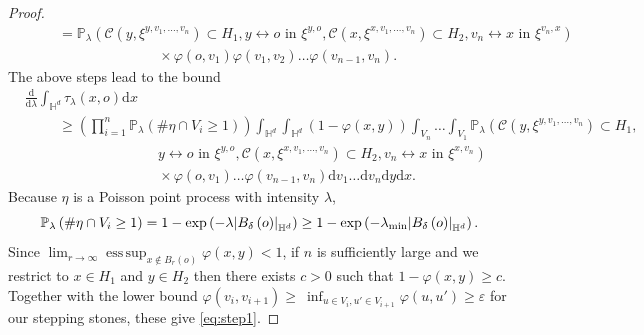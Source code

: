\documentclass[10pt,a4paper,dvipsnames]{article}
\theoremstyle{definition}
\theoremstyle{remark}
\newcommand{\pla}{\mathbb P_\lambda}
\newcommand{\HypDim}{{\mathbb{H}^d}}
\newcommand{\dd}{\mathrm{d}} %
\newcommand{\C}{\mathscr {C}}
\DeclareMathOperator*{\esssup}{ess\,sup}
\newcommand{\conn}[3]{#1 \longleftrightarrow #2\textrm { in } #3}
\newcommand{\tlam}{\tau_\lambda}
\DeclarePairedDelimiter\abs{\lvert}{\rvert}
\newcommand{\habsd}[1]{\abs*{#1}_\HypDim}
\newcommand{\orig}{o}
\newcommand{\connf}{\varphi}
\numberwithin{equation}{section}
\begin{document}
\begin{proof}
\begin{align}
        &\hspace{1cm} = \pla\left(\C\left(y,\xi^{y,v_1,\ldots,v_n}\right)\subset H_1, \conn{y}{\orig}{\xi^{y,\orig}}, \C\left(x,\xi^{x,v_1,\ldots,v_n}\right)\subset  H_2,\conn{v_n}{x}{\xi^{v_n,x}}\right)\nonumber\\
        &\hspace{4cm}\times\connf\left(\orig,v_1\right)\connf\left(v_1,v_2\right)\ldots\connf\left(v_{n-1},v_n\right).
    \end{align}
    The above steps lead to the bound
    \begin{align}
        &\frac{\dd}{\dd \lambda}\int_{\HypDim}\tlam\left(x,\orig\right)\dd x\nonumber\\
        &\hspace{1cm}\geq\left(\prod^n_{i=1}\pla\left(\#\eta\cap V_i \geq 1\right)\right)\int_{\HypDim}\int_{\HypDim} (1-\connf(x,y))\int_{V_n}\ldots\int_{V_1}\pla\left(\C\left(y,\xi^{y,v_1,\ldots,v_n}\right)\subset H_1, \right.\nonumber\\
        &\hspace{4cm}\left.\conn{y}{\orig}{\xi^{y,\orig}}, \C\left(x,\xi^{x,v_1,\ldots,v_n}\right)\subset  H_2,\conn{v_n}{x}{\xi^{x,v_n}}\right)\nonumber\\
        &\hspace{4cm}\times\connf(\orig,v_1)\ldots\connf\left(v_{n-1},v_n\right)\dd v_1\ldots\dd v_n\dd y\dd x.
    \end{align}
    Because $\eta$ is a Poisson point process with intensity $\lambda$, 
    $$\pla\left(\#\eta\cap V_i \geq 1\right) = 1 - \exp\left(-\lambda\habsd{B_\delta\left(\orig\right)}\right) \geq 1 - \exp\left(-\lambda_{\min}\habsd{B_\delta\left(\orig\right)}\right).$$ 
    Since $\lim_{r\to \infty}\esssup_{x\not\in B_r(\orig)}\connf(x,y)<1$, if $n$ is sufficiently large and we restrict to $x\in H_1$ and $y\in H_2$ then there exists $c>0$ such that $1-\connf\left(x,y\right)\geq c$. Together with the lower bound $\connf\left(v_i,v_{i+1}\right)\geq\ \inf_{u\in V_i,u'\in V_{i+1}}\connf\left(u,u'\right)\geq \varepsilon$ for our stepping stones, these give \eqref{eq:step1}. 


\end{proof}
\end{document}
